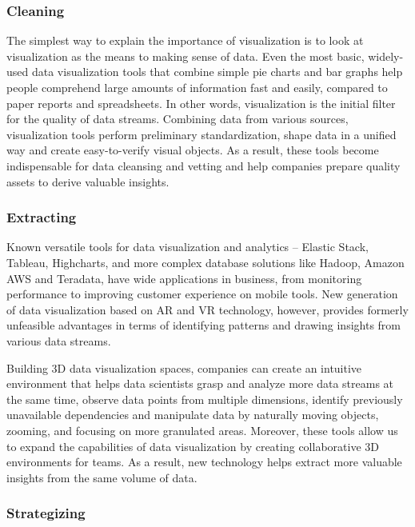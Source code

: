 \documentclass[]{book}
\theoremstyle{definition}
\theoremstyle{definition}
\theoremstyle{definition}
\theoremstyle{remark}
\begin{document}
\subsubsection{Cleaning}\label{cleaning}

The simplest way to explain the importance of visualization is to look
at visualization as the means to making sense of data. Even the most
basic, widely-used data visualization tools that combine simple pie
charts and bar graphs help people comprehend large amounts of
information fast and easily, compared to paper reports and spreadsheets.
In other words, visualization is the initial filter for the quality of
data streams. Combining data from various sources, visualization tools
perform preliminary standardization, shape data in a unified way and
create easy-to-verify visual objects. As a result, these tools become
indispensable for data cleansing and vetting and help companies prepare
quality assets to derive valuable insights.

\subsubsection{Extracting}\label{extracting}

Known versatile tools for data visualization and analytics -- Elastic
Stack, Tableau, Highcharts, and more complex database solutions like
Hadoop, Amazon AWS and Teradata, have wide applications in business,
from monitoring performance to improving customer experience on mobile
tools. New generation of data visualization based on AR and VR
technology, however, provides formerly unfeasible advantages in terms of
identifying patterns and drawing insights from various data streams.

Building 3D data visualization spaces, companies can create an intuitive
environment that helps data scientists grasp and analyze more data
streams at the same time, observe data points from multiple dimensions,
identify previously unavailable dependencies and manipulate data by
naturally moving objects, zooming, and focusing on more granulated
areas. Moreover, these tools allow us to expand the capabilities of data
visualization by creating collaborative 3D environments for teams. As a
result, new technology helps extract more valuable insights from the
same volume of data.

\subsubsection{Strategizing}\label{strategizing}
\end{document}
